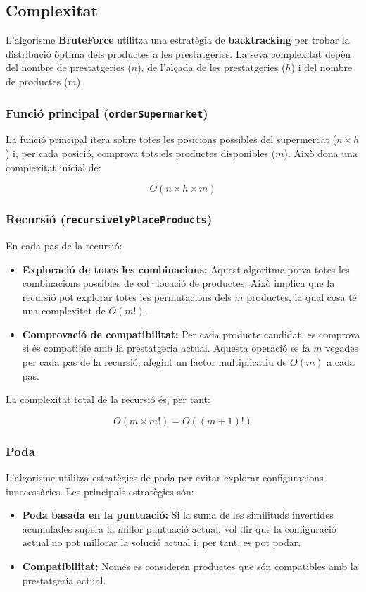 \documentclass[a4paper,12pt]{report}
\begin{document}
\begin{itemize}
\subsection{Complexitat}
L'algorisme \textbf{BruteForce} utilitza una estratègia de \textbf{backtracking} per trobar la distribució òptima dels productes a les prestatgeries. La seva complexitat depèn del nombre de prestatgeries (\(n\)), de l'alçada de les prestatgeries (\(h\)) i del nombre de productes (\(m\)).

\subsubsection{Funció principal (\texttt{orderSupermarket})}

La funció principal itera sobre totes les posicions possibles del supermercat (\(n \times h\)) i, per cada posició, comprova tots els productes disponibles (\(m\)). Això dona una complexitat inicial de:

\[
O(n \times h \times m)
\]

\subsubsection{Recursió (\texttt{recursivelyPlaceProducts})}

En cada pas de la recursió:
\begin{itemize}
    \item \textbf{Exploració de totes les combinacions:} Aquest algoritme prova totes les combinacions possibles de col·locació de productes. Això implica que la recursió pot explorar totes les permutacions dels \(m\) productes, la qual cosa té una complexitat de \(O(m!)\).
    \item \textbf{Comprovació de compatibilitat:} Per cada producte candidat, es comprova si és compatible amb la prestatgeria actual. Aquesta operació es fa \(m\) vegades per cada pas de la recursió, afegint un factor multiplicatiu de \(O(m)\) a cada pas.
\end{itemize}

La complexitat total de la recursió és, per tant:

\[
O(m \times m!) = O((m+1)!)
\]

\subsubsection{Poda}

L'algorisme utilitza estratègies de poda per evitar explorar configuracions innecessàries. Les principals estratègies són:
\begin{itemize}
    \item \textbf{Poda basada en la puntuació:} Si la suma de les similituds invertides acumulades supera la millor puntuació actual, vol dir que la configuració actual no pot millorar la solució actual i, per tant, es pot podar.
    \item \textbf{Compatibilitat:} Només es consideren productes que són compatibles amb la prestatgeria actual.
\end{itemize}


\end{itemize}
\end{document}
